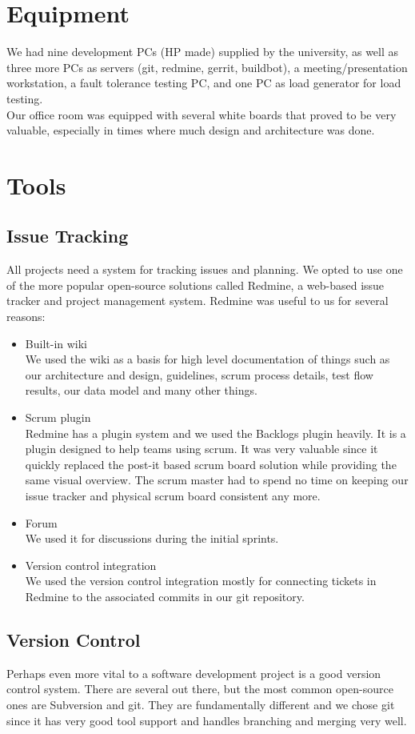 \documentclass[11pt,a4paper]{report}
\begin{document}
\section{Equipment}
We had nine development PCs (HP made) supplied by the university, as
well as three more PCs as servers (git, redmine, gerrit, buildbot),
a meeting/presentation workstation, a fault tolerance testing PC,
and one PC as load generator for load testing. \\
Our office room was equipped with several white boards that proved to be
very valuable, especially in times where much design and architecture was done.
\section{Tools}
\subsection{Issue Tracking}
All projects need a system for tracking issues and planning. We opted to use
one of the more popular open-source solutions called Redmine, a web-based issue
tracker and project management system. Redmine was useful to us for several
reasons:
\begin{itemize}
\item Built-in wiki \\
  We used the wiki as a basis for high level documentation of things such as our
  architecture and design, guidelines, scrum process details, test flow results,
  our data model and many other things.
\item Scrum plugin \\
  Redmine has a plugin system and we used the Backlogs plugin heavily. It is a
  plugin designed to help teams using scrum. It was very valuable since it
  quickly replaced the post-it based scrum board solution while providing the
  same visual overview. The scrum master had to spend no time on keeping our
  issue tracker and physical scrum board consistent any more.
\item Forum \\
  We used it for discussions during the initial sprints.
\item Version control integration \\
  We used the version control integration mostly for connecting tickets in
  Redmine to the associated commits in our git repository.
\end{itemize}
\subsection{Version Control}
Perhaps even more vital to a software development project is a good version
control system. There are several out there, but the most common open-source
ones are Subversion and git. They are fundamentally different and we chose git
since it has very good tool support and handles branching and merging very well.
\end{document}
